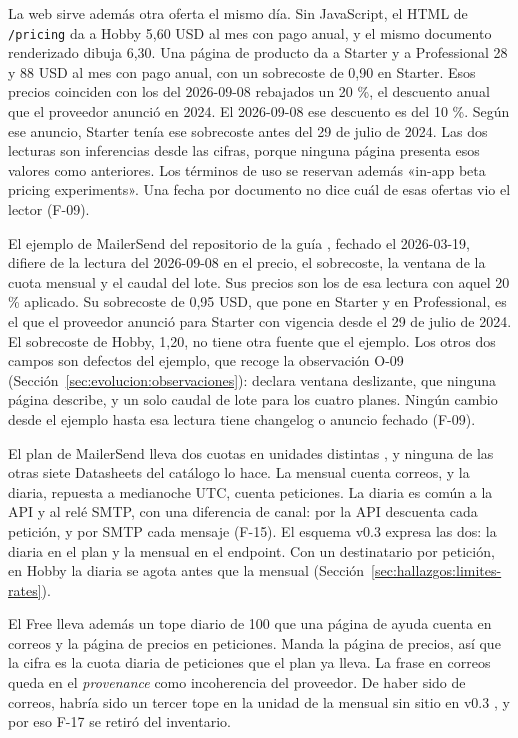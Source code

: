 La web sirve además otra oferta el mismo día. Sin JavaScript, el HTML de
\texttt{/pricing} da a Hobby 5,60 USD al mes con pago anual, y el mismo documento
renderizado dibuja 6,30. Una página de producto da a Starter y a Professional 28 y 88
USD al mes con pago anual, con un sobrecoste de 0,90 en Starter. Esos precios
coinciden con los del 2026-09-08 rebajados un 20 \%, el descuento anual que el proveedor
anunció en 2024. El 2026-09-08 ese descuento es del 10 \%. Según ese anuncio, Starter tenía ese
sobrecoste antes del 29 de julio de 2024. Las dos lecturas son inferencias desde las
cifras, porque ninguna página presenta esos valores como anteriores. Los términos de
uso se reservan además «in-app beta pricing experiments». Una fecha por documento no
dice cuál de esas ofertas vio el lector (F-09).

El ejemplo de MailerSend del repositorio de la guía \citep{apisconsumptionmodel},
fechado el 2026-03-19, difiere de la lectura del 2026-09-08 en el precio, el sobrecoste, la
ventana de la cuota mensual y el caudal del lote. Sus precios son los de esa lectura con aquel
20 \% aplicado. Su sobrecoste de 0,95 USD, que pone en Starter y en Professional, es
el que el proveedor anunció para Starter con vigencia desde el 29 de julio de 2024. El
sobrecoste de Hobby, 1,20, no tiene otra fuente que el ejemplo. Los otros dos campos
son defectos del ejemplo, que recoge la observación O-09
(Sección~\ref{sec:evolucion:observaciones}): declara ventana deslizante, que ninguna
página describe, y un solo caudal de lote para los cuatro planes. Ningún cambio desde
el ejemplo hasta esa lectura tiene changelog o anuncio fechado (F-09).

El plan de MailerSend lleva dos cuotas en unidades distintas \citep{mailersenddocs},
y ninguna de las otras siete Datasheets del catálogo lo hace. La mensual cuenta correos, y la
diaria, repuesta a medianoche UTC, cuenta peticiones. La diaria es común a la API y al
relé SMTP, con una diferencia de canal: por la API descuenta cada petición, y por SMTP
cada mensaje (F-15). El esquema v0.3 expresa las dos: la diaria en el plan y la
mensual en el endpoint. Con un destinatario por petición, en Hobby la diaria se agota antes
que la mensual (Sección~\ref{sec:hallazgos:limites-rates}).

El Free lleva además un tope diario de 100 que una página de ayuda cuenta en correos y
la página de precios en peticiones. Manda la página de precios, así que la cifra es la
cuota diaria de peticiones que el plan ya lleva. La frase en correos queda en el
\textit{provenance} como incoherencia del proveedor. De haber sido de correos, habría
sido un tercer tope en la unidad de la mensual sin sitio en v0.3
\citep{apisconsumptionmodel}, y por eso F-17 se retiró del inventario.

